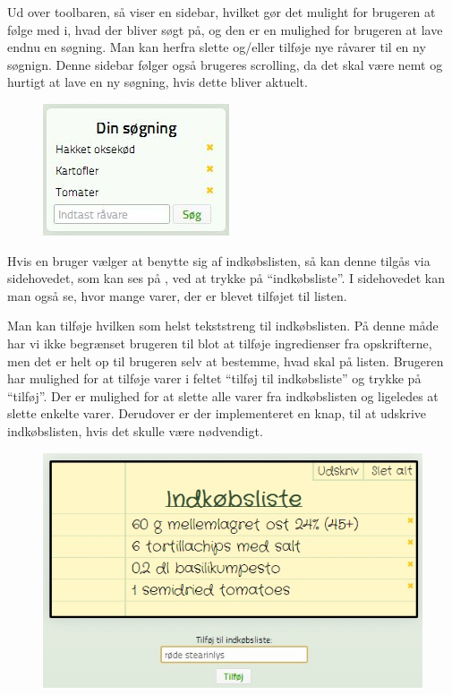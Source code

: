 Ud over toolbaren, så viser  en sidebar, hvilket gør det mulight for brugeren at følge med i, hvad der bliver søgt på, og den er en mulighed for brugeren at lave endnu en søgning. Man kan herfra slette og/eller tilføje nye råvarer til en ny søgnign. Denne sidebar følger også brugeres scrolling, da det skal være nemt og hurtigt at lave en ny søgning, hvis dette bliver aktuelt.

\begin{figure}[H]
	\centering
	\includegraphics[scale=0.7]{billeder/foodl/sidebar.jpg}
	\label{fig:foodl-sidebar}
\end{figure}

Hvis en bruger vælger at benytte sig af indkøbslisten, så kan denne tilgås via sidehovedet, som kan ses på , ved at trykke på ``indkøbsliste''. I sidehovedet kan man også se, hvor mange varer, der er blevet tilføjet til listen. 

Man kan tilføje hvilken som helst tekststreng til indkøbslisten. På denne måde har vi ikke begrænset brugeren til blot at tilføje ingredienser fra opskrifterne, men det er helt op til brugeren selv at bestemme, hvad skal på listen. Brugeren har mulighed for at tilføje varer i feltet ``tilføj til indkøbsliste'' og trykke på ``tilføj''. Der er mulighed for at slette alle varer fra indkøbslisten og ligeledes at slette enkelte varer. Derudover er der implementeret en knap, til at udskrive indkøbslisten, hvis det skulle være nødvendigt.

\begin{figure}[H]
	\centering
	\includegraphics[scale=0.7]{billeder/foodl/indkoebsliste.jpg}
	\label{fig:foodl-indkoebsliste}
\end{figure}

